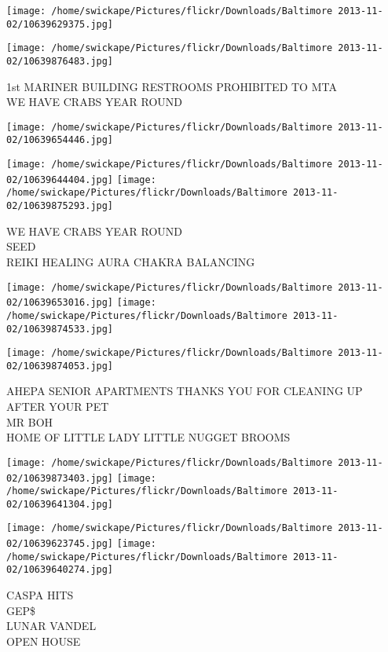 \documentclass[10pt,letterpaper]{article}
\begin{document}
\texttt{[image: /home/swickape/Pictures/flickr/Downloads/Baltimore 2013-11-02/10639629375.jpg]}

\vspace{0.25in}
\texttt{[image: /home/swickape/Pictures/flickr/Downloads/Baltimore 2013-11-02/10639876483.jpg]}

1st MARINER BUILDING RESTROOMS PROHIBITED TO MTA\\
WE HAVE CRABS YEAR ROUND\\
\pagebreak

\texttt{[image: /home/swickape/Pictures/flickr/Downloads/Baltimore 2013-11-02/10639654446.jpg]}

\vspace{0.25in}
\texttt{[image: /home/swickape/Pictures/flickr/Downloads/Baltimore 2013-11-02/10639644404.jpg]}
\texttt{[image: /home/swickape/Pictures/flickr/Downloads/Baltimore 2013-11-02/10639875293.jpg]}

WE HAVE CRABS YEAR ROUND\\
SEED\\
REIKI HEALING AURA CHAKRA BALANCING\\
\pagebreak

\texttt{[image: /home/swickape/Pictures/flickr/Downloads/Baltimore 2013-11-02/10639653016.jpg]}
\texttt{[image: /home/swickape/Pictures/flickr/Downloads/Baltimore 2013-11-02/10639874533.jpg]}

\vspace{0.25in}
\texttt{[image: /home/swickape/Pictures/flickr/Downloads/Baltimore 2013-11-02/10639874053.jpg]}

AHEPA SENIOR APARTMENTS THANKS YOU FOR CLEANING UP AFTER YOUR PET\\
MR BOH\\
HOME OF LITTLE LADY LITTLE NUGGET BROOMS\\
\pagebreak

\texttt{[image: /home/swickape/Pictures/flickr/Downloads/Baltimore 2013-11-02/10639873403.jpg]}
\texttt{[image: /home/swickape/Pictures/flickr/Downloads/Baltimore 2013-11-02/10639641304.jpg]}

\texttt{[image: /home/swickape/Pictures/flickr/Downloads/Baltimore 2013-11-02/10639623745.jpg]}
\texttt{[image: /home/swickape/Pictures/flickr/Downloads/Baltimore 2013-11-02/10639640274.jpg]}

CASPA HITS\\
GEP\$\\
LUNAR VANDEL\\
OPEN HOUSE\\
\pagebreak
\end{document}
